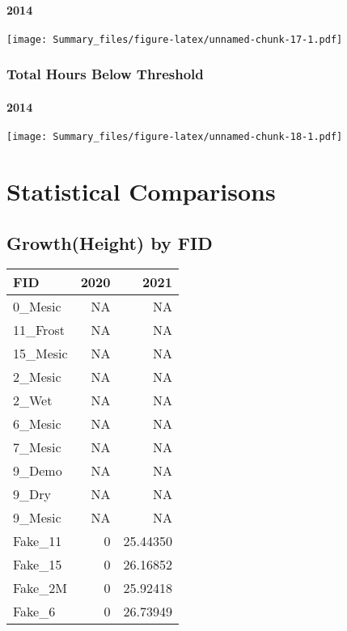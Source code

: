 \documentclass[
]{article}
\begin{document}
\hypertarget{section-16}{%
\paragraph{2014}\label{section-16}}

\texttt{[image: Summary\_files/figure-latex/unnamed-chunk-17-1.pdf]}

\hypertarget{total-hours-below-threshold}{%
\subsubsection{Total Hours Below
Threshold}\label{total-hours-below-threshold}}

\hypertarget{section-17}{%
\paragraph{2014}\label{section-17}}

\texttt{[image: Summary\_files/figure-latex/unnamed-chunk-18-1.pdf]}

\hypertarget{statistical-comparisons}{%
\section{Statistical Comparisons}\label{statistical-comparisons}}

\hypertarget{growthheight-by-fid}{%
\subsection{Growth(Height) by FID}\label{growthheight-by-fid}}

\begin{table}[H]
\centering
\begin{tabular}{l|r|r}
\hline
FID & 2020 & 2021\\
\hline
0\_Mesic & NA & NA\\
\hline
11\_Frost & NA & NA\\
\hline
15\_Mesic & NA & NA\\
\hline
2\_Mesic & NA & NA\\
\hline
2\_Wet & NA & NA\\
\hline
6\_Mesic & NA & NA\\
\hline
7\_Mesic & NA & NA\\
\hline
9\_Demo & NA & NA\\
\hline
9\_Dry & NA & NA\\
\hline
9\_Mesic & NA & NA\\
\hline
Fake\_11 & 0 & 25.44350\\
\hline
Fake\_15 & 0 & 26.16852\\
\hline
Fake\_2M & 0 & 25.92418\\
\hline
Fake\_6 & 0 & 26.73949\\
\hline
\end{tabular}
\end{table}
\end{document}
